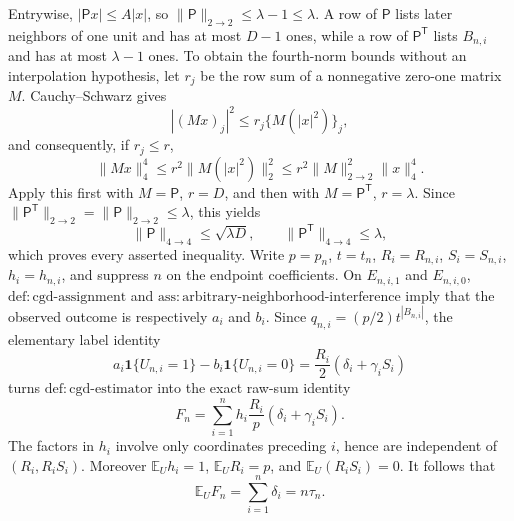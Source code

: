 Entrywise, \(|\mathsf Px|\le A|x|\), so \(\|\mathsf P\|_{2\to2}\le\lambda-1\le\lambda\).  A row of \(\mathsf P\) lists later neighbors of one unit and has at most \(D-1\) ones, while a row of \(\mathsf P^{\mathsf T}\) lists \(B_{n,i}\) and has at most \(\lambda-1\) ones.  To obtain the fourth-norm bounds without an interpolation hypothesis, let \(r_j\) be the row sum of a nonnegative zero-one matrix \(M\).  Cauchy--Schwarz gives
\[
 |(Mx)_j|^2\le r_j\{M(|x|^2)\}_j,
\]
and consequently, if \(r_j\le r\),
\[
 \|Mx\|_4^4\le r^2\|M(|x|^2)\|_2^2
 \le r^2\|M\|_{2\to2}^2\|x\|_4^4.
\]
Apply this first with \(M=\mathsf P\), \(r=D\), and then with \(M=\mathsf P^{\mathsf T}\), \(r=\lambda\).  Since \(\|\mathsf P^{\mathsf T}\|_{2\to2}=\|\mathsf P\|_{2\to2}\le\lambda\), this yields
\[
 \|\mathsf P\|_{4\to4}\le\sqrt{\lambda D},\qquad
 \|\mathsf P^{\mathsf T}\|_{4\to4}\le\lambda,
\]
which proves every asserted inequality.
Write \(p=p_n\), \(t=t_n\), \(R_i=R_{n,i}\), \(S_i=S_{n,i}\), \(h_i=h_{n,i}\), and suppress \(n\) on the endpoint coefficients.  On \(E_{n,i,1}\) and \(E_{n,i,0}\), \(\mathrm{def:cgd\text{-}assignment}\) and \(\mathrm{ass:arbitrary\text{-}neighborhood\text{-}interference}\) imply that the observed outcome is respectively \(a_i\) and \(b_i\).  Since \(q_{n,i}=(p/2)t^{|B_{n,i}|}\), the elementary label identity
\[
 a_i\mathbf 1\{U_{n,i}=1\}-b_i\mathbf 1\{U_{n,i}=0\}
 =\frac{R_i}{2}(\delta_i+\gamma_iS_i)
\]
turns \(\mathrm{def:cgd\text{-}estimator}\) into the exact raw-sum identity
\[
 F_n=\sum_{i=1}^nh_i\frac{R_i}{p}(\delta_i+\gamma_iS_i).
\]
The factors in \(h_i\) involve only coordinates preceding \(i\), hence are independent of \((R_i,R_iS_i)\).  Moreover \(\mathbb E_Uh_i=1\), \(\mathbb E_UR_i=p\), and \(\mathbb E_U(R_iS_i)=0\).  It follows that
\[
 \mathbb E_UF_n=\sum_{i=1}^n\delta_i=n\tau_n.
\]

